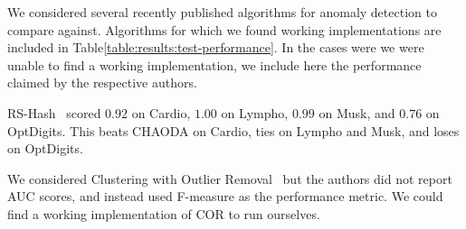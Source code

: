 We considered several recently published algorithms for anomaly detection to compare against.
Algorithms for which we found working implementations are included in Table\ref{table:results:test-performance}.
In the cases were we were unable to find a working implementation, we include here the performance claimed by the respective authors.

RS-Hash~\cite{sathe2016subspace} scored $0.92$ on Cardio, $1.00$ on Lympho, $0.99$ on Musk, and $0.76$ on OptDigits.
This beats CHAODA on Cardio, ties on Lympho and Musk, and loses on OptDigits.

We considered Clustering with Outlier Removal~\cite{liu2019clustering} but the authors did not report AUC scores, and instead used F-measure as the performance metric.
We could find a working implementation of COR to run ourselves.





